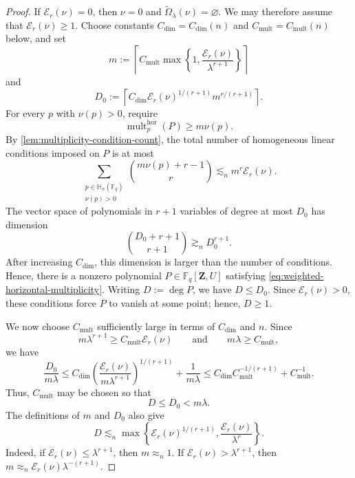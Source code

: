 \documentclass[11pt,letterpaper]{amsart}
\numberwithin{equation}{section}
\theoremstyle{definition}
\theoremstyle{remark}
\newcommand{\Fq}{\mathbb F_q}
\newcommand{\HH}{\mathbb H}
\begin{document}
\begin{proof}
If $\mathcal E_r(\nu)=0$, then $\nu=0$ and
$\widetilde\Omega_\lambda(\nu)=\varnothing$.  We may therefore assume
that $\mathcal E_r(\nu)\geq1$.  Choose
constants $C_{\mathrm{dim}}=C_{\mathrm{dim}}(n)$ and
$C_{\mathrm{mult}}=C_{\mathrm{mult}}(n)$ below, and set
\[
 m
 :=
 \left\lceil
 C_{\mathrm{mult}}\max\left\{1,
 \frac{\mathcal E_r(\nu)}{\lambda^{r+1}}\right\}
 \right\rceil
\]
and
\[
 D_0
 :=
 \left\lceil
 C_{\mathrm{dim}}\mathcal E_r(\nu)^{1/(r+1)}m^{r/(r+1)}
 \right\rceil.
\]
For every $p$ with $\nu(p)>0$, require
\begin{equation}\label{eq:weighted-horizontal-multiplicity}
 \operatorname{mult}^{\mathrm{hor}}_p(P)\geq m\nu(p).
\end{equation}
By \cref{lem:multiplicity-condition-count}, the total number of
homogeneous linear conditions imposed on $P$ is at most
\[
 \sum_{\substack{p\in\HH_n(\Fq)\\\nu(p)>0}}
 \binom{m\nu(p)+r-1}{r}
 \lesssim_n
 m^r\mathcal E_r(\nu).
\]
The vector space of polynomials in $r+1$ variables of degree at most $D_0$ has dimension
\[
 \binom{D_0+r+1}{r+1}
 \gtrsim_n D_0^{r+1}.
\]
After increasing $C_{\mathrm{dim}}$, this dimension is larger than the number of conditions. Hence, there is a nonzero polynomial
$P\in\Fq[\mathbf Z,U]$ satisfying \eqref{eq:weighted-horizontal-multiplicity}.
Writing $D:=\deg P$, we have $D\leq D_0$.
Since $\mathcal E_r(\nu)>0$, these conditions force $P$ to vanish at some point; hence, $D\geq1$.

We now choose $C_{\mathrm{mult}}$ sufficiently large in terms of
$C_{\mathrm{dim}}$ and $n$. Since
\[
 m\lambda^{r+1}\geq C_{\mathrm{mult}}\mathcal E_r(\nu)
 \qquad\text{and}\qquad
 m\lambda\geq C_{\mathrm{mult}},
\]
we have
\[
 \frac{D_0}{m\lambda}
 \leq
 C_{\mathrm{dim}}
 \left(\frac{\mathcal E_r(\nu)}{m\lambda^{r+1}}\right)^{1/(r+1)}
 +\frac1{m\lambda}
 \leq
 C_{\mathrm{dim}}C_{\mathrm{mult}}^{-1/(r+1)}
 +C_{\mathrm{mult}}^{-1}.
\]
Thus, $C_{\mathrm{mult}}$ may be chosen so that
\begin{equation}\label{eq:weighted-degree-less-than-line-multiplicity}
 D\leq D_0<m\lambda.
\end{equation}
The definitions of $m$ and $D_0$ also give
\begin{equation}\label{eq:weighted-degree-bound}
 D
 \lesssim_n
 \max\left\{
 \mathcal E_r(\nu)^{1/(r+1)},
 \frac{\mathcal E_r(\nu)}{\lambda^r}
 \right\}.
\end{equation}
Indeed, if $\mathcal E_r(\nu)\leq\lambda^{r+1}$, then
$m\approx_n 1$. If $\mathcal E_r(\nu)>\lambda^{r+1}$, then
$m\approx_n \mathcal E_r(\nu)\lambda^{-(r+1)}$.


\end{proof}
\end{document}
